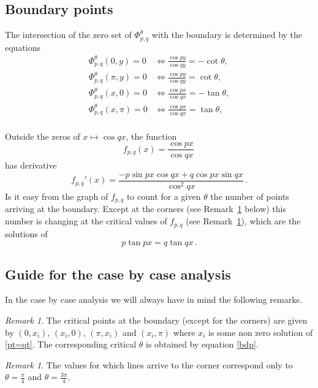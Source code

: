 \documentclass[a4paper,reqno,11pt]{amsart}
\theoremstyle{remark}
\newtheorem{remark}[thm]{Remark}
\theoremstyle{definition}
\numberwithin{equation}{section}
\begin{document}
\subsection{Boundary points}
\label{ss5.2}
The intersection of the zero set of  $\Phi^\theta_{p,q}$ with the boundary is determined by the equations
\begin{equation}\label{bdp}
\begin{aligned}
\Phi^\theta_{p,q}(0,y)=0 &\iff \frac{\cos p y}{\cos q y}=-\cot\theta,\\
\Phi^\theta_{p,q}(\pi,y)=0 &\iff \frac{\cos py}{\cos q y}=\cot\theta,\\
\Phi^\theta_{p,q}(x,0)=0 &\iff \frac{\cos p x}{\cos q x}=-\tan\theta,\\
\Phi^\theta_{p,q}(x,\pi)=0 &\iff \frac{\cos px}{\cos q x}=\tan\theta,\\
\end{aligned}
\end{equation}

Outside the zeros of $x\mapsto \cos qx$, the function 
\begin{equation}\label{deffpq}
f_{p,q} (x)=\frac{\cos px}{\cos qx}\,
\end{equation}
has derivative 
\[
f_{p,q}'(x)= \frac{- p \sin px  \cos q x  +q  \cos p x \sin q x}{\cos ^2 q x}\,.
\]
Is it easy from the graph of $f_{p,q}$ to count for a given $\theta$  the number 
of points arriving at the boundary. Except at the corners 
(see Remark~\ref{remcor} below) this number is changing at the critical values 
of $f_{p,q}$ (see Remark~\ref{rem4.4}), which are the solutions of 
\begin{equation}
\label{pt=qt}
p \tan px = q \tan qx\,.
\end{equation}

\subsection{Guide for the case by case analysis}
In the case by case analysis we will always have in mind the following remarks.
\begin{remark} \label{rem4.4}
The critical points at the boundary (except for the corners) are given 
by $(0,x_i)$, $(x_i,0)$, $(\pi, x_i)$ and $(x_i,\pi)$ where $x_i$ is some non 
zero solution of \eqref{pt=qt}. The corresponding critical $\theta$ is 
obtained by equation \eqref{bdp}.  \end{remark}
\begin{remark}\label{remcor}
The values for 
which lines arrive to the corner correspond only to $\theta=\frac \pi 4$ and 
$\theta =\frac {3\pi}4$.
\end{remark}
\end{document}
